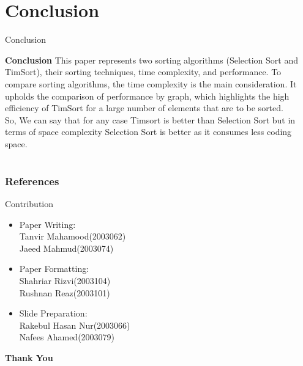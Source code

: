 \documentclass[aspectratio=169]{beamer}
\begin{document}
      \section{Conclusion}
    \begin{frame}{Conclusion}
  
    \textbf{\fontsize{14}{16}\selectfont Conclusion}\newline
    This paper represents two sorting algorithms (Selection Sort and TimSort), their sorting techniques, time complexity, and performance. To compare sorting algorithms, the time complexity is the main consideration.\newline
     It upholds the comparison of performance by graph, which highlights the high efficiency of TimSort for a large number of elements that are to be sorted.\newline
     \\So, We can say that for any case Timsort is better than Selection Sort but in terms of space complexity Selection Sort is better as it consumes less coding space.
    
\end{frame}

    \section*{ }
    \begin{frame}[t]
    
        \frametitle{References}
        \centering
        \small
        
        
    \end{frame}

\begin{frame}{Contribution}
    \begin{itemize}
        \item Paper Writing:\\
        Tanvir Mahamood(2003062)\\
        Jaeed Mahmud(2003074)\\\newline
        \item Paper Formatting:\\
        Shahriar Rizvi(2003104)\\
        Rushnan Reaz(2003101)\\\newline
        \item Slide Preparation:\\
        Rakebul Hasan Nur(2003066)\\
        Nafees Ahamed(2003079)
    \end{itemize}
 
    
    \begin{center}
        \textbf{Thank You}
    \end{center}
\end{frame}
    
\end{document}
